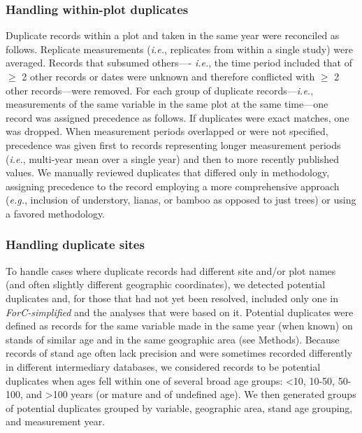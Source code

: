 \documentclass[
]{article}
\begin{document}
\hypertarget{handling-within-plot-duplicates}{%
\subsubsection{Handling within-plot
duplicates}\label{handling-within-plot-duplicates}}

Duplicate records within a plot and taken in the same year were
reconciled as follows. Replicate measurements (\emph{i.e.}, replicates
from within a single study) were averaged. Records that subsumed
others---- \emph{i.e.}, the time period included that of \(\ge\) 2 other
records or dates were unknown and therefore conflicted with \(\ge\) 2
other records---were removed. For each group of duplicate
records---\emph{i.e.}, measurements of the same variable in the same
plot at the same time---one record was assigned precedence as follows.
If duplicates were exact matches, one was dropped. When measurement
periods overlapped or were not specified, precedence was given first to
records representing longer measurement periods (\emph{i.e.}, multi-year
mean over a single year) and then to more recently published values. We
manually reviewed duplicates that differed only in methodology,
assigning precedence to the record employing a more comprehensive
approach (\emph{e.g.}, inclusion of understory, lianas, or bamboo as
opposed to just trees) or using a favored methodology.

\hypertarget{handling-duplicate-sites}{%
\subsubsection{Handling duplicate
sites}\label{handling-duplicate-sites}}

To handle cases where duplicate records had different site and/or plot
names (and often slightly different geographic coordinates), we detected
potential duplicates and, for those that had not yet been resolved,
included only one in \emph{ForC-simplified} and the analyses that were
based on it. Potential duplicates were defined as records for the same
variable made in the same year (when known) on stands of similar age and
in the same geographic area (see Methods). Because records of stand age
often lack precision and were sometimes recorded differently in
different intermediary databases, we considered records to be potential
duplicates when ages fell within one of several broad age groups:
\textless10, 10-50, 50-100, and \textgreater100 years (or mature and of
undefined age). We then generated groups of potential duplicates grouped
by variable, geographic area, stand age grouping, and measurement year.
\end{document}
